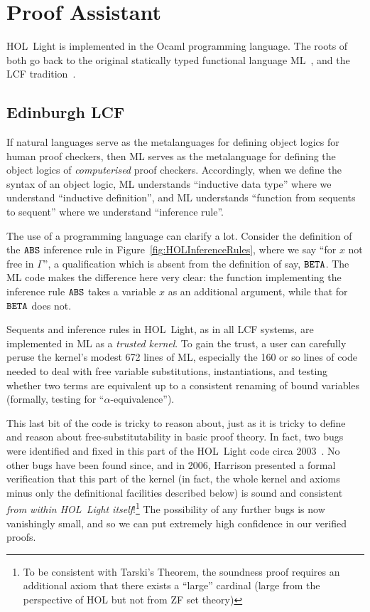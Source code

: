 \section{Proof Assistant}\label{sec:LCF}
HOL~Light is implemented in the Ocaml programming language. The roots of both go back to the original statically typed functional language ML~\cite{StandardML}, and the LCF tradition~\cite{LCF}.

\subsection{Edinburgh LCF}
If natural languages serve as the metalanguages for defining object logics for human proof checkers, then ML serves as the metalanguage for defining the object logics of \emph{computerised} proof checkers. Accordingly, when we define the syntax of an object logic, ML understands ``inductive data type'' where we understand ``inductive definition'', and ML understands ``function from sequents to sequent'' where we understand ``inference rule''.

The use of a programming language can clarify a lot. Consider the definition of the $\texttt{ABS}$ inference rule in Figure~\ref{fig:HOLInferenceRules}, where we say ``for $x$ not free in $\Gamma$'', a qualification which is absent from the definition of say, $\texttt{BETA}$. The ML code makes the difference here very clear: the function implementing the inference rule $\texttt{ABS}$ takes a variable $x$ as an additional argument, while that for $\texttt{BETA}$ does not.

Sequents and inference rules in HOL~Light, as in all LCF systems, are implemented in ML as a \emph{trusted kernel}. To gain the trust, a user can carefully peruse the kernel's modest 672 lines of ML, especially the 160 or so lines of code needed to deal with free variable substitutions, instantiations, and testing whether two terms are equivalent up to a consistent renaming of bound variables (formally, testing for ``$\alpha$-equivalence'').

This last bit of the code is tricky to reason about, just as it is tricky to define and reason about free-substitutability in basic proof theory. In fact, two bugs were identified and fixed in this part of the HOL~Light code circa 2003~\cite{HOLLightBugs}. No other bugs have been found since, and in 2006, Harrison presented a formal verification that this part of the kernel (in fact, the whole kernel and axioms minus only the definitional facilities described below) is sound and consistent \emph{from within HOL~Light itself}!\footnote{To be consistent with Tarski's Theorem, the soundness proof requires an additional axiom that there exists a ``large'' cardinal (large from the perspective of HOL but not from ZF set theory)}\cite{SelfVerifyHOLLight} The possibility of any further bugs is now vanishingly small, and so we can put extremely high confidence in our verified proofs.


